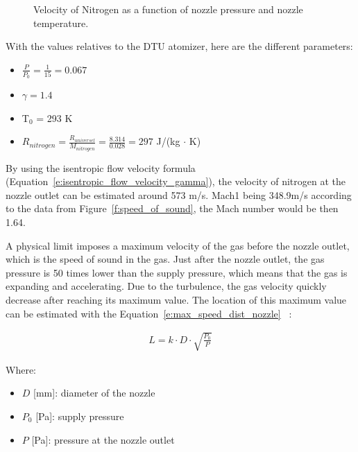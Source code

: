 \documentclass[../main]{subfiles}
\begin{document}
\vspace{0mm}
\begin{figure}[H]
    \centering
        
        \caption{Velocity of Nitrogen as a function of nozzle pressure and nozzle temperature.}
        \label{f:velocity_nitrogen_3d}
\end{figure}
\FloatBarrier
\vspace{0mm}

With the values relatives to the DTU atomizer, here are the different parameters:
\begin{itemize}
    \item $\frac{P}{P_0} = \frac{1}{15} = 0.067$
    \item $\gamma = 1.4$
    \item T$_0$ = 293 K
    \item $R_{nitrogen} = \frac{R_{universel}}{M_{nitrogen}} =\frac{8.314}{0.028} = 297$ J/(kg $\cdot$ K)
\end{itemize}
By using the isentropic flow velocity formula (Equation~\ref{e:isentropic_flow_velocity_gamma}), the velocity of nitrogen at the nozzle outlet can be estimated around 573 m/s. Mach1 being 348.9m/s according to the data from Figure~\ref{f:speed_of_sound}, the Mach number would be then 1.64.

A physical limit imposes a maximum velocity of the gas before the nozzle outlet, which is the speed of sound in the gas. Just after the nozzle outlet, the gas pressure is 50 times lower than the supply pressure, which means that the gas is expanding and accelerating. Due to the turbulence, the gas velocity quickly decrease after reaching its maximum value. The location of this maximum value can be estimated with the Equation~\ref{e:max_speed_dist_nozzle} ~\cite{LargeEddySimulation,Orescanin2014FlowSupersonic,Ashkenas1965StructureUtilization}:

\vspace{0mm}
\begin{equation}
\begin{aligned}
L = k \cdot D \cdot \sqrt{\frac{P_0}{P}}
\label{e:max_speed_dist_nozzle}
\end{aligned}
\end{equation}
\vspace{0mm}

\vspace{0mm}
\begin{minipage}{\linewidth}
Where:
\begin{itemize}
    \item $D$ [mm]: diameter of the nozzle
    \item $P_0$ [Pa]: supply pressure
    \item $P$ [Pa]: pressure at the nozzle outlet
\end{itemize}
\end{minipage}
\vspace{0mm}
\end{document}
